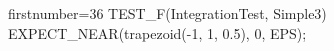 \begin{cppcode*}{firstnumber=36}
TEST_F(IntegrationTest, Simple3) {
  EXPECT_NEAR(trapezoid(-1, 1, 0.5), 0, EPS);
}
\end{cppcode*}
